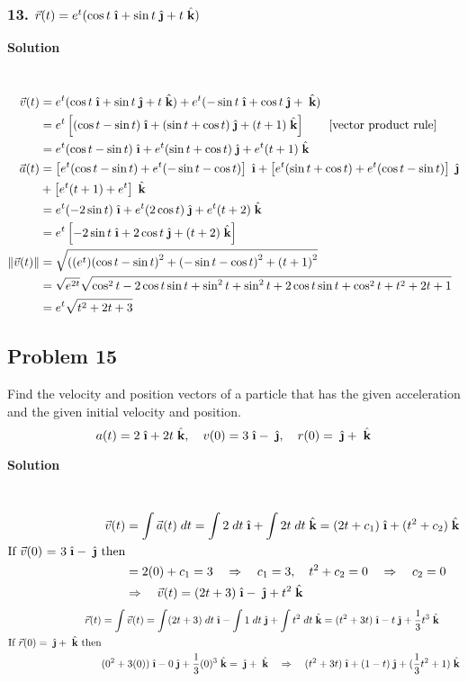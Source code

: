 \documentclass{article}
\newcommand{\ihat}{\;\hat{\textbf{\i}}}
\newcommand{\jhat}{\;\hat{\textbf{\j}}}
\newcommand{\khat}{\;\hat{\textbf{k}}}
\newcommand{\rvec}{\vec{r}(t)}
\newcommand\vc[2]{\vec{#1}(#2)}
\newcommand\mgv[1]{\|#1\|}
\newcommand\mgvvv[3]{\sqrt{\left(#1\right)^2 + \left(#2\right)^2 + \left(#3\right)^2}}
\newcommand\rr{\quad\Rightarrow\quad}
\begin{document}
\subsubsection*{13. $\rvec = e^t(\cos t\ihat + \sin t\jhat + t\khat)$}
\centerline{\textbf{Solution}} \\
\begin{align*}
    \vc v t &= e^t(\cos t\ihat + \sin t\jhat + t\khat) + e^t(-\sin t\ihat + \cos t\jhat + \khat)  \\
            &= e^t\left[(\cos t - \sin t)\ihat + (\sin t + \cos t)\jhat + (t + 1)\khat\right] \qquad [\text{vector product rule}] \\
            &= e^t(\cos t - \sin t)\ihat + e^t(\sin t + \cos t)\jhat + e^t(t + 1)\khat \\
    \vc a t &= \left[e^t(\cos t - \sin t) + e^t(-\sin t - \cos t)\right]\ihat + \left[e^t(\sin t + \cos t) + e^t(\cos t - \sin t)\right]\jhat \\
            &+ \left[e^t(t + 1) + e^t\right]\khat \\
            &= e^t(-2\sin t)\ihat + e^t(2\cos t)\jhat + e^t(t + 2)\khat \\
            &= e^t\left[-2\sin t\ihat + 2\cos t\jhat + (t + 2)\khat \right] \\
    \mgv{\vc v t} &= \mgvvv{(e^t) (\cos t - \sin t}{-\sin t - \cos t}{t + 1} \\
                  &= \sqrt{e^{2t}}\sqrt{\cos^2 t - 2\cos t \sin t + \sin^2 t + \sin^2 t + 2\cos t \sin t + \cos^2 t + t^2 + 2t + 1} \\ 
                  &= e^t\sqrt{t^2 + 2t + 3} \\
\end{align*}
\subsection*{Problem 15}

Find the velocity and position vectors of a particle that has the given acceleration and the given initial velocity and position.
\[
    a(t) = 2\ihat + 2t\khat, \quad v(0) = 3\ihat - \jhat, \quad r(0) = \jhat + \khat
\]
\centerline{\textbf{Solution}} \\
\begin{align*}
    \vc v t &= \int \vc a t \; dt  =  \int 2\;dt\ihat + \int 2t\;dt\khat  = (2t + c_1)\ihat + (t^2 + c_2)\khat \\
    \text{If $\vc v 0$ = $3\ihat - \jhat$ then} \\
            &= 2(0) + c_1 = 3 \rr c_1 = 3, \quad t^2 + c_2 = 0 \rr c_2 = 0 \\
            &\Rightarrow\quad \vc v t = (2t + 3)\ihat - \jhat + t^2\khat
\end{align*}
\begin{align*}
    \vc r t &= \int \vc v t = \int (2t + 3)\;dt\ihat - \int 1\;dt\jhat + \int t^2\;dt\khat = (t^2 + 3t)\ihat - t\jhat + \frac 1 3 t^3\khat \\
    \text{If $\vc r 0 = \jhat + \khat$ then} \\
            &(0^2 + 3(0))\ihat  - 0\jhat + \frac 1 3(0)^3\khat = \jhat + \khat \rr (t^2 + 3t)\ihat + (1 - t)\jhat + (\frac 1 3 t^2 + 1)\khat \\ 
\end{align*}
\end{document}
